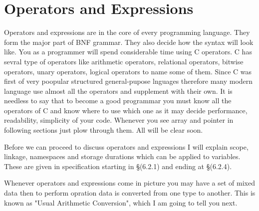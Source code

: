 \chapter{Operators and Expressions}
Operators and expressions are in the core of every programming language. They
form the major part of BNF grammar. They also decide how the syntax will look
like. You as a programmer will spend considerable time using C operators. C has
sevral type of operators like arithmetic operators, relational operators,
bitwise operators, unary operators, logical operators to name some of them.
Since C was first of very poopular structured general-pupose lnguages therefore
many modern language use almost all the operators and supplement with their own.
It is needless to say that to become a good programmar you must know all the
operators of C and know where to use which one as it may decide performance,
readability, simplicity of your code. Whenever you see array and pointer in
following sections just plow through them. All will be clear soon.

Before we can proceed to discuss operators and expressions I will explain
scope, linkage, namespaces and storage durations which can be applied to
variables. These are given in specification starting in \S(6.2.1) and ending at
\S(6.2.4).


Whenever operators and expressions come in picture you may have a set of mixed
data then to perform opration data is converted from one type to another. This
is known as "Usual Arithmetic Conversion", which I am going to tell you next.